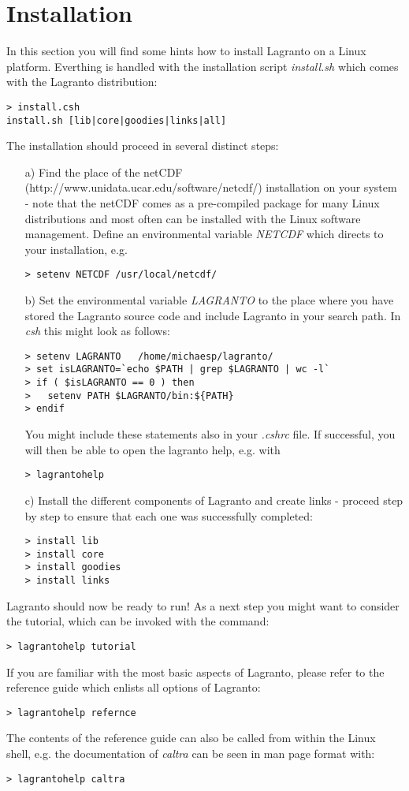 \documentclass[a4paper,10pt]{article}
\begin{document}
\section{Installation}

In this section you will find some hints how to install Lagranto on a Linux platform. Everthing is handled with the installation script {\em install.sh} which comes with the Lagranto distribution:
\begin{verbatim}
> install.csh 
install.sh [lib|core|goodies|links|all]
\end{verbatim}
The installation should proceed in several distinct steps:
\begin{itemize}
\item[a)] Find the place of the netCDF (http://www.unidata.ucar.edu/software/netcdf/) installation on your system - note that the netCDF comes as a pre-compiled package for many Linux distributions and most often can be installed with the Linux software management. Define an environmental variable {\em NETCDF} which directs to your installation, e.g.
\begin{verbatim}
> setenv NETCDF /usr/local/netcdf/
\end{verbatim}
\item[b)] Set the environmental variable {\em LAGRANTO} to the place where you have stored the Lagranto source code and include Lagranto in your search path. In {\em csh} this might look as follows:
\begin{verbatim}
> setenv LAGRANTO   /home/michaesp/lagranto/
> set isLAGRANTO=`echo $PATH | grep $LAGRANTO | wc -l`
> if ( $isLAGRANTO == 0 ) then
>   setenv PATH $LAGRANTO/bin:${PATH}
> endif
\end{verbatim}
You might include these statements also in your {\em .cshrc} file. If successful, you will then be able to open the lagranto help, e.g. with
\begin{verbatim}
> lagrantohelp
\end{verbatim} 
\item[c)] Install the different components of Lagranto and create links - proceed step by step to ensure that each one was successfully completed:
\begin{verbatim}
> install lib
> install core
> install goodies
> install links
\end{verbatim} 
\end{itemize}
Lagranto should now be ready to run! As a next step you might want to consider the tutorial, which can be invoked with the command:
\begin{verbatim}
> lagrantohelp tutorial
\end{verbatim}
If you are familiar with the most basic aspects of Lagranto, please refer to the reference guide which enlists all options of Lagranto:
\begin{verbatim}
> lagrantohelp refernce
\end{verbatim}
The contents of the reference guide can also be called from within the Linux shell, e.g. the documentation of {\em caltra} can be seen in man page format with:
\begin{verbatim}
> lagrantohelp caltra 
\end{verbatim}
\end{document}
